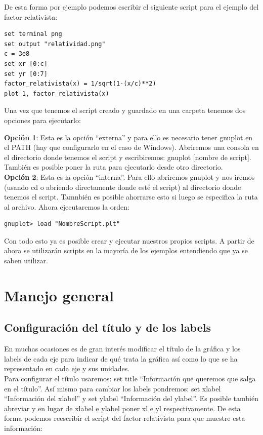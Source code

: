 \documentclass[11pt,a4paper,twoside,pdf]{article}
\numberwithin{equation}{section}
\begin{document}
De esta forma por ejemplo podemos escribir el siguiente script para el ejemplo del factor relativista:

\begin{lstlisting}[language=Gnuplot]
set terminal png
set output "relatividad.png"
c = 3e8
set xr [0:c]
set yr [0:7]
factor_relativista(x) = 1/sqrt(1-(x/c)**2)
plot 1, factor_relativista(x)
\end{lstlisting}

Una vez que tenemos el script creado y guardado en una carpeta tenemos dos opciones para ejecutarlo:

\textbf{Opción 1}: Esta es la opción ``externa'' y para ello es necesario tener gnuplot en el PATH (hay que configurarlo en el caso de Windows). Abriremos una consola en el directorio donde tenemos el script y escribiremos: gnuplot [nombre de script]. También es posible poner la ruta para ejecutarlo desde otro directorio. \\

\textbf{Opción 2}: Esta es la opción ``interna''. Para ello abriremos gnuplot y nos iremos (usando cd o abriendo directamente donde esté el script) al directorio donde tenemos el script. Tamnbién es posible ahorrarse esto si luego se especifica la ruta al archivo. Ahora ejecutaremos la orden:

\begin{lstlisting}[language=Gnuplot]
gnuplot> load "NombreScript.plt"
\end{lstlisting}

Con todo esto ya es posible crear y ejecutar nuestros propios scripts. A partir de ahora se utilizarán scripts en la mayoría de los ejemplos entendiendo que ya se saben utilizar.

\section{Manejo general}

\subsection{Configuración del título y de los labels}

En muchas ocasiones es de gran interés modificar el título de la gráfica y los labels de cada eje para indicar de qué trata la gráfica así como lo que se ha representado en cada eje y sus unidades. \\

Para configurar el título usaremos: set title ``Información que queremos que salga en el título''. Así mismo para cambiar los labels pondremos: set xlabel ``Información del xlabel'' y set ylabel ``Información del ylabel''. Es posible también abreviar y en lugar de xlabel e ylabel poner xl e yl respectivamente. De esta forma podemos reescribir el script del factor relativista para que muestre esta información:
\end{document}
